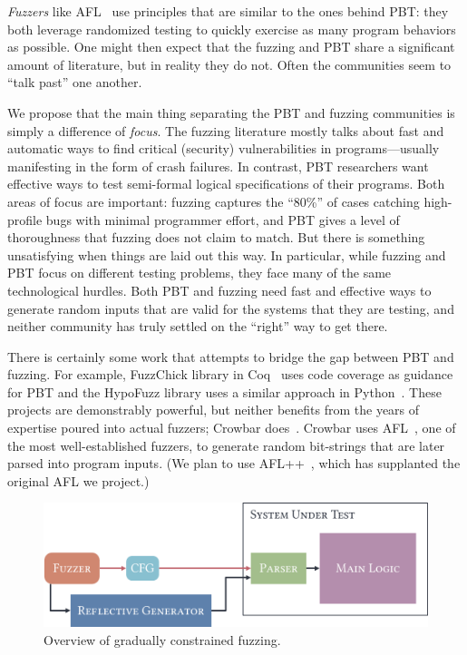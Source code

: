 {\em Fuzzers} like AFL~\cite{afl-readme} use principles that are similar to the
ones behind PBT: they both leverage randomized testing to quickly exercise as
many program behaviors as possible.  One might then expect that the fuzzing and
PBT share a significant amount of literature, but in reality they do not. Often
the communities seem to ``talk past'' one another.

We propose that the main thing separating the PBT and fuzzing communities is
simply a difference of {\em focus}. The fuzzing literature mostly talks about
fast and automatic ways to find critical (security) vulnerabilities in
programs---usually manifesting in the form of crash failures.  In contrast, PBT
researchers want effective ways to test semi-formal logical specifications of
their programs. Both areas of focus are important: fuzzing captures the ``80\%''
of cases catching high-profile bugs with minimal programmer effort, and PBT
gives a level of thoroughness that fuzzing does not claim to match. But there is
something unsatisfying when things are laid out this way. In particular, while
fuzzing and PBT focus on different testing problems, they face many of the same
technological hurdles. Both PBT and fuzzing need fast and effective ways to
generate random inputs that are valid for the systems that they are testing, and
neither community has truly settled on the ``right'' way to get there.

There is certainly some work that attempts to bridge the gap between PBT and
fuzzing. For example, FuzzChick library in Coq~\cite{OLDlampropoulos19fuzzchick}
uses code coverage as guidance for PBT and the HypoFuzz library uses a
similar approach in Python~\cite{hatfield-dodds_hypofuzz_nodate}. These projects
are demonstrably powerful, but neither benefits from the years of expertise
poured into actual fuzzers; Crowbar does~\cite{dolan2017testing}. Crowbar uses
AFL~\cite{afl-readme}, one of the most well-established
fuzzers, to generate random bit-strings that are later parsed into program
inputs.  (We plan to use AFL++~\cite{fioraldi_afl_2020},
which has supplanted the original AFL we project.)

\begin{figure}
  \centering
  \includegraphics[width=.4\textwidth]{assets/fuzzing.pdf}
  \caption{Overview of gradually constrained fuzzing.}\label{fig:fuzzing-plan}
\end{figure}

